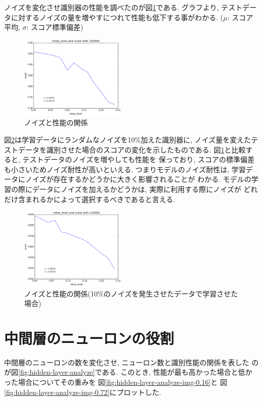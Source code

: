 \documentclass[10pt,a4paper,twocolumn]{jarticle}
\begin{document}
ノイズを変化させ識別器の性能を調べたのが図\ref{fig:noise-level-test-cl0.0}である. 
グラフより, テストデータに対するノイズの量を増やすにつれて性能も低下する事がわかる. 
($\mu$: スコア平均, $\sigma$: スコア標準偏差)
\begin{figure}[htbp]
  \centering
  \includegraphics[width=0.45\textwidth]{assets/img/noise_level_test_mnist_cl0.0.eps}
  \caption{ノイズと性能の関係}
  \label{fig:noise-level-test-cl0.0}
\end{figure}

図\ref{fig:noise-level-test-cl0.1}は学習データにランダムなノイズを10\%加えた識別器に, 
ノイズ量を変えたテストデータを識別させた場合のスコアの変化を示したものである.
図\ref{fig:noise-level-test-cl0.0}と比較すると, テストデータのノイズを増やしても性能を
保っており, スコアの標準偏差も小さいためノイズ耐性が高いといえる. 
つまりモデルのノイズ耐性は, 学習データにノイズが存在するかどうかに大きく影響されることが
わかる.  モデルの学習の際にデータにノイズを加えるかどうかは, 実際に利用する際にノイズが
どれだけ含まれるかによって選択するべきであると言える. 
\begin{figure}[htbp]
  \centering
  \includegraphics[width=0.45\textwidth]{assets/img/noise_level_test_mnist_cl0.1.eps}
  \caption{ノイズと性能の関係(10\%のノイズを発生させたデータで学習させた場合)}
  \label{fig:noise-level-test-cl0.1}
\end{figure}

\section{中間層のニューロンの役割}
中間層のニューロンの数を変化させ, ニューロン数と識別性能の関係を表した
のが図\ref{fig:hidden-layer-analyze}である. 
このとき, 性能が最も高かった場合と低かった場合についてその重みを
図\ref{fig:hidden-layer-analyze-img-0.16}と
図\ref{fig:hidden-layer-analyze-img-0.72}にプロットした. 
\end{document}
